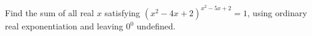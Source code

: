 Find the sum of all real $x$ satisfying $(x^2-4x+2)^{x^2-5x+2}=1$, using ordinary real exponentiation and leaving $0^0$ undefined.

